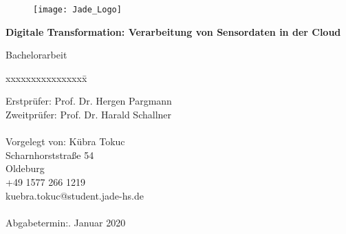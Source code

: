 \begin{titlepage}
  \begin{centering}
  \begin{figure}[h!]
    \centering
    \texttt{[image: Jade\_Logo]}
  \end{figure}



  \vspace*{0.4cm}

  \textsf{\Huge \textbf{Digitale Transformation: Verarbeitung von Sensordaten in der Cloud\\}}

  \vspace*{0.5cm}
  \noindent Bachelorarbeit\\

  \end{centering}

  \vspace*{1.5cm}
  \begin{tabbing}
  xxxxxxxxxxxxxxxx\= \kill

  \small Erstprüfer:\> Prof. Dr. Hergen Pargmann\\
  \small Zweitprüfer:\> Prof. Dr. Harald Schallner\\\\

  \small Vorgelegt von: \>Kübra Tokuc\\
  \small \>Scharnhorststraße 54\\
  \small {} Oldeburg\\
  \small \>+49 1577 266 1219\\
  \small \>kuebra.tokuc@student.jade-hs.de\\\\

  \small Abgabetermin:. Januar 2020
  \end{tabbing}
\end{titlepage}
\newpage

